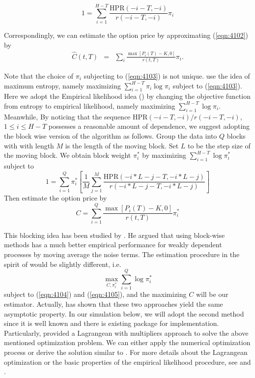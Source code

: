 \begin{equation}\label{eqn:4103}
1=\sum_{i=1}^{H-T} \frac{\mathrm{HPR}(-i-T,-i)}{r(-i-T,-i)}\pi_i
\end{equation}

Correspondingly, we can estimate the option price by approximating (\ref{eqn:4102}) by
\begin{eqnarray}
\hat{C}(t,T)&=& \sum_{i} \frac{\max[P_i(T)-K,0]}{r(t,T)}  \pi_i.
\end{eqnarray}

Note that the choice of $\pi_i$ subjecting to (\ref{eqn:4103}) is not unique. \citet{stutzer1996simple} use the idea of maximum entropy, namely maximizing $\sum^{H-T}_{i=1}\pi_i\log\pi_i$ subject to (\ref{eqn:4103}). Here we adopt the Empirical likelihood idea (\citet{owen1988empirical}) by changing the objective function from entropy to empirical likelihood, namely maximizing $\sum^{H-T}_{i=1}\log\pi_i$. Meanwhile, By noticing that the sequence $\mathrm{HPR}(-i-T,-i)/r(-i-T,-i)$, $1\leq i\leq H-T$ possesses a reasonable amount of dependence, we suggest  adopting the block wise version of the algorithm as follows. Group the data into $Q$ blocks with with length $M$ is the length of the moving block. Set $L$ to be the step size of the moving block. We obtain block weight $\pi^*_i$ by maximizing $\sum_{i=1}^{H-T} \log\pi_i^*$ subject to 
\begin{equation}\label{eqn:4104}
1=\sum_{i=1}^{Q} \pi^*_i \left[\frac{1}{M} \sum_{j=1}^M \frac{\mathrm{HPR}(-i*L-j-T, -i*L-j)}{r(-i*L-j-T, -i*L-j)}\right]
\end{equation} 
Then estimate the option price by 
\begin{equation}\label{eqn:4105}
C  =  \sum_{i=1}^Q \frac{\max[P_i(T)-K,0]}{r(t,T)}  \pi^*_i
\end{equation} 


This blocking idea has been studied by \citet{kitamura1997empirical}. He argued that using block-wise methods has a much better empirical performance for weakly dependent processes by moving average the noise terms. The estimation procedure in the spirit of \citet{kitamura1997empirical} would be slightly different, i.e. 
\begin{equation}
\max_{C, \pi_i^*} \sum_{i=1}^{Q} \log\pi_i^*
\end{equation}
subject to (\ref{eqn:4104}) and  (\ref{eqn:4105}), and the maximizing $C$ will be our estimator. Actually, \citet{peng2015onclass} has shown that these two approaches yield the same asymptotic property. In our simulation below, we will adopt the second method since it is well known and there is existing package for implementation. Particularly, \citet{qin1994empirical} provided a Lagrangean with multipliers approach to solve the above mentioned optimization problem. We can either apply the numerical optimization process or derive the solution similar to \citet{qin1994empirical}. For more details about the Lagrangean optimization or the basic properties of the empirical likelihood procedure, see \citet{owen1990empirical} and \citet{qin1994empirical}. 
  

